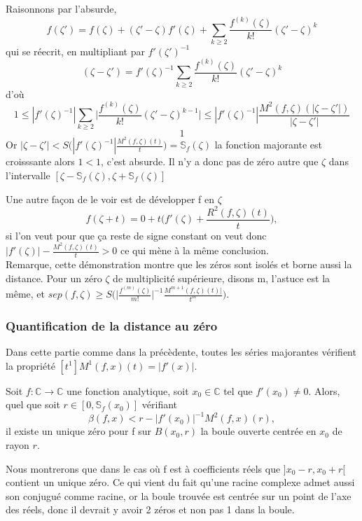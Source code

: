 \documentclass[a4paper,10.5pt]{article}
\begin{document}
	\begin{demonstration}Raisonnons par l'absurde, 
	\[f(\zeta ')=f(\zeta)+(\zeta '-\zeta)f'(\zeta)+ \sum_{k \geq 2}\frac{f^{(k)}(\zeta)}{k!}(\zeta'-\zeta)^k\]
	qui se réecrit, en multipliant par $f'(\zeta ')^{-1}$
	\[(\zeta-\zeta')=f'(\zeta)^{-1} \sum_{k \geq 2}\frac{f^{(k)}(\zeta)}{k!}(\zeta'-\zeta)^k\]
	d'où 
	\[1 \leq |f'(\zeta)^{-1}|\sum_{k \geq 2}  \big|\frac{f^{(k)}(\zeta)}{k!}(\zeta'-\zeta)^{k-1} \big|\leq |f'(\zeta)^{-1}| \frac{M^{2}(f,\zeta)(|\zeta-\zeta'|)}{|\zeta-\zeta'|}\]
	\[1 \]
	Or $|\zeta-\zeta'|<S\Big(|f'(\zeta)^{-1}|\frac{M^{2}(f,\zeta)(t)}{t}\Big)=\mathbb{S}_{f}(\zeta)$ la fonction majorante est croisssante alors $1<1$, c'est absurde. Il n'y a donc  pas de zéro autre que $\zeta$  dans l'intervalle $[\zeta-\mathbb{S}_{f}(\zeta),\zeta+\mathbb{S}_{f}(\zeta)]$
	\end{demonstration} 
	\vspace{7mm}
	\noindent Une autre façon de le voir est de développer f en $\zeta$
	\[f(\zeta +t)=0+t\Big(f'(\zeta)+\frac{R^{2}(f,\zeta)(t)}{t}\Big), \]
	si l'on veut pour que ça reste de signe constant on veut donc $|f'(\zeta)|-\frac{M^{2}(f,\zeta)(t)}{t} >0$ ce qui mène à la même conclusion.\\
	Remarque, cette démonstration montre que les zéros sont isolés et borne aussi la distance. Pour un zéro $\zeta$ de multiplicité supérieure, disons m, l'astuce est la même, et $sep(f,\zeta) \geq S\big(\big|\frac{f^{(m)}(\zeta)}{m!}\big|^{-1}\frac{M^{m+1}(f,\zeta)(t)|}{t^{m}}\big)$.
	\subsubsection{Quantification de la distance au zéro}
	Dans cette partie comme dans la précèdente, toutes les séries majorantes vérifient la propriété $[t^1]M^{1}(f,x)(t)=|f'(x)|$.
	\begin{theorem} Soit $f:\mathbb{C} \rightarrow \mathbb{C}$ une fonction analytique, soit $x_0 \in \mathbb{C}$ tel que $f'(x_0) \neq 0$. Alors, quel que soit $r\in [0,\mathbb{S}_{f}(x_0)]$ vérifiant
	\[\beta(f,x)<r-|f'(x_0)|^{-1}M^2(f,x)(r),\]
	il existe un unique zéro pour f sur $B(x_0,r)$ la boule ouverte centrée en $x_0$ de rayon $r$. 
	\end{theorem}
	 Nous montrerons que dans le cas où f est à coefficients réels que $]x_0-r,x_0+r[$ contient un unique zéro. Ce qui vient du fait qu'une racine complexe admet aussi son conjugué comme racine, or la boule trouvée est centrée sur un point de l'axe des réels, donc il devrait y avoir 2 zéros et non pas 1 dans la boule.
	 
\end{document}
